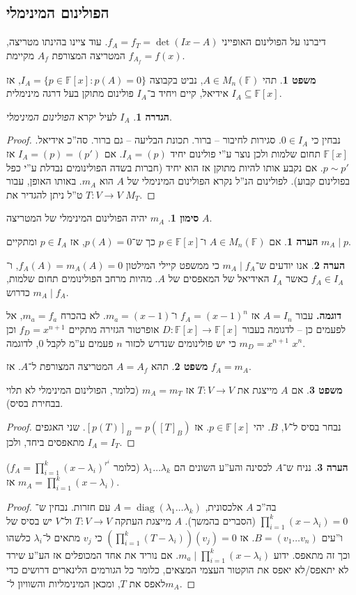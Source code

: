 \documentclass[a4paper]{article}
\DeclareMathOperator{\diag}    {diag}
\newcommand\F         {\mathbb{F}}
\newcommand\co        {\colon}
\renewcommand\lg      {\lambda}
\newcommand\cl [1]    {\left ( #1 \right )}
\theoremstyle{definition}
\newtheorem{Theorem}{משפט}
\newtheorem{definition}{הגדרה}
\newtheorem{Remark}{הערה}
\newtheorem{Notion}{סימון}
\newcommand\theo  [1] {\begin{Theorem}#1\end{Theorem}}
\newcommand\defi  [1] {\begin{definition}#1\end{definition}}
\newcommand\rmark [1] {\begin{Remark}#1\end{Remark}}
\newcommand\noti  [1] {\begin{Notion}#1\end{Notion}}
\begin{document}
	\subsection{הפולינום המינימלי}
	
	דיברנו על הפולינום האופייני $f_A = f_T = \det(Ix - A)$. עוד ציינו בהינתו מטריצה, המטריצה המצורפת $A_f$ מקיימת $f_{A_f} = f(x)$. 
	
	
	\theo{תהי $A \in M_n(\F)$, נביט בקבוצה $I_A = \{p \in \F[x] \co p(A) = 0\}$, אז $I_A \subseteq \F[x]$ אידיאל, קיים ויחיד ב־$I_A$ פולינום מתוקן בעל דרגה מינימלית. }
	\defi{$I_A$ לעיל יקרא \textit{הפולינום המינימלי}. }
	\begin{proof}
		נבחין כי $0 \in I_A$. סגירות לחיבור – ברור. תכונת הבליעה – גם ברור. סה''כ אידיאל. 
		$\F[x]$ תחום שלמות ולכן נוצר ע''י פולינום יחיד $I_A = (p)$. אם $I_A = (p) = (p')$ אז $p \sim p'$. אם נקבע אותו להיות מתוקן אז הוא יחיד (חברות בשדה הפולינומים נבדלת ע''י כפל בפולינום קבוע).  לפולינום הנ''ל נקרא הפולינום המינימלי של $A$ הוא $m_A$. באותו האופן, עבור $T \co V \to V$ ט''ל ניתן להגדיר את $M_T$. 
	\end{proof}
	
	\noti{$m_A$ יהיה הפולינום המינימלי של המטריצה $A$. }
	
	\rmark{אם $A \in M_n(\F)$ ו־$p \in \F[x]$ כך ש־$p(A) = 0$, אז $p \in I_A$ ומתקיים $m_A \mid p$. }
	
	\rmark{אנו יודעים ש־$m_A \mid f_A$ כי ממשפט קיילי המילטון $f_A(A) = m_A(A) = 0$, ו־$f_A \in I_A$ כאשר $I_A$ האידיאל של המאפסים של $A$. מהיות מרחב הפולינומים תחום שלמות, $m_A \mid f_A$ כדרוש. }
	
	\textbf{דוגמה. }עבור $A = I_n$ אז $f_A = (x - 1)^{n}$ ו־$m_a = (x - 1)$. לא בהכרח $m_a = f_a$, אל לפעמים כן – לדגומה בעבור $D \co \F[x] \to \F[x]$ אופרטור הגזירה מתקיים $f_D = x^{n + 1}$ וכן $m_D = x^{n + 1}$ כי יש פולינומים שנדרש לכזור $n$ פעמים ע''מ לקבל $0$, לדוגמה $x^{n}$. 
	
	\theo{תהא $A =A_f$ המטריצה המצורפת ל־$A$. אז $f_A = m_A$.}
	\theo{אם $A$ מייצגת את $T \co V \to V$ אז $m_A = m_T$ (כלומר, הפולינום המינימלי לא תלוי בבחירת בסיס).}
	\begin{proof}
		נבחר בסיס ל־$V$, $B$. יהי $p \in \F[x]$. אז $[p(T)]_B = p([T]_B)$. שני האגפים מתאפסים ביחד, ולכן $I_A = I_T$. 
	\end{proof}
	\rmark{נניח ש־$A$ לכסינה והע''ע השונים הם $\lg_1 \dots \lg_k$ (כלומר $f_A = \prod_{i = 1}^{k}(x - \lg_i)^{r^i}$) אז $m_A = \prod_{i = 1}^{k}(x - \lg_i)$. }
	
	\begin{proof}
		בה''כ $A$ אלכסונית, $A = \diag(\lg_1 \dots \lg_k)$ עם חזרות. נבחין ש־$\prod_{i = 1}^{k} (x - \lg_i) = 0$ (הסברים בהמשך). $A$ מייצגת העתקה $T \co V \to V$ ול־$V$ יש בסיס של ו''עים $B = (v_1 \dots v_n)$.  אז $\cl{\prod_{i = 1}^{k}(T - \lg_i)}(v_j) = 0$ כי $v_j$ מתאים ל־$\lg_i$ כלשהו וכך זה מתאפס. ידוע $m_a \mid \prod_{i = 1}^{k}(x - \lg_i)$. אם נוריד את אחד המכופלים אז הע''ע שירד לא יתאפס/לא יאפס את הוקטור העצמי המצאים, כלומר כל הגורמים הלינארים דרושים כדי לאפס את $T$, ומכאן המינימליות והשוויון ל־$m_A$. 
	\end{proof}
	
\end{document}
